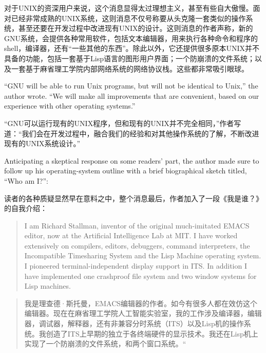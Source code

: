 \ifdefined\chs
对于UNIX的资深用户来说，这个消息显得太过理想主义，甚至有些自大傲慢。面对已经非常成熟的UNIX系统，这则消息不仅号称要从头克隆一套类似的操作系统，甚至还要在开发过程中改进现有UNIX的设计。这则消息的作者声称，新的GNU系统，会提供各种常用软件，包括文本编辑器，用来执行各种命令和程序的shell，编译器，还有``一些其他的东西''。除此以外，它还提供很多原本UNIX并不具备的功能，包括一套基于Lisp语言的图形用户界面；一个防崩溃的文件系统；以及一套基于麻省理工学院内部网络系统的网络协议栈。这些都非常吸引眼球。
\fi

\ifdefined\eng
``GNU will be able to run Unix programs, but will not be identical to Unix,'' the author wrote. ``We will make all improvements that are convenient, based on our experience with other operating systems.''
\fi

\ifdefined\chs
``GNU可以运行现有的UNIX程序，但和现有的UNIX并不完全相同，''作者写道：``我们会在开发过程中，融合我们的经验和对其他操作系统的了解，不断改进现有的UNIX系统设计。''
\fi

\ifdefined\eng
Anticipating a skeptical response on some readers' part, the author made sure to follow up his operating-system outline with a brief biographical sketch titled, ``Who am I?'':
\fi

\ifdefined\chs
读者的各种质疑显然早在意料之中，整个消息最后，作者加入了一段《我是谁？》的自我介绍：
\fi

\ifdefined\eng
\begin{quote}
I am Richard Stallman, inventor of the original much-imitated EMACS editor, now at the Artificial Intelligence Lab at MIT. I have worked extensively on compilers, editors, debuggers, command interpreters, the Incompatible Timesharing System and the Lisp Machine operating system. I pioneered terminal-independent display support in ITS. In addition I have implemented one crashproof file system and two window systems for Lisp machines.
\end{quote}
\fi

\ifdefined\chs
\begin{quote}
我是理查德·斯托曼，EMACS编辑器的作者。如今有很多人都在效仿这个编辑器。现在在麻省理工学院人工智能实验室，我的工作涉及编译器，编辑器，调试器，解释器，还有非兼容分时系统（ITS）以及Lisp机的操作系统。我创造了ITS上早期的独立于各终端硬件的显示技术。我还在Lisp机上实现了一个防崩溃的文件系统，和两个窗口系统。``
\end{quote}
\fi

